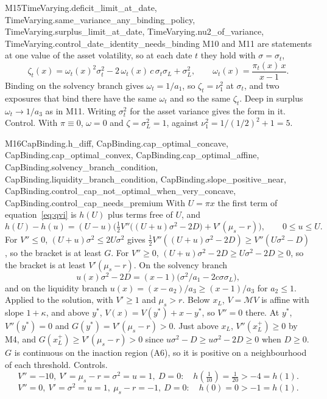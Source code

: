 \begin{mproof}{M15}{TimeVarying.deficit_limit_at_date, TimeVarying.same_variance_any_binding_policy, TimeVarying.surplus_limit_at_date, TimeVarying.nu2_of_variance, TimeVarying.control_date_identity_needs_binding}
M10 and M11 are statements at one value of the asset volatility, so at each date
$t$ they hold with $\sigma=\sigma_t$,
\[ \zeta_t(x)=\omega_t(x)^2\sigma_t^2-2\,\omega_t(x)\,c\,\sigma_t\sigma_L+\sigma_L^2,\qquad \omega_t(x)=\frac{\pi_t(x)\,x}{x-1} . \]
Binding on the solvency branch gives $\omega_t=1/a_1$, so $\zeta_t=\nu_1^2$ at
$\sigma_t$, and two exposures that bind there have the same $\omega_t$ and so the
same $\zeta_t$. Deep in surplus $\omega_t\to1/a_3$ as in M11. Writing $\sigma_t^2$
for the asset variance gives the form in it. Control. With $\pi\equiv0$,
$\omega=0$ and $\zeta=\sigma_L^2=1$, against $\nu_1^2=1/(1/2)^2+1=5$.
\end{mproof}

\begin{mproof}{M16}{CapBinding.h_diff, CapBinding.cap_optimal_concave, CapBinding.cap_optimal_convex, CapBinding.cap_optimal_affine, CapBinding.solvency_branch_condition, CapBinding.liquidity_branch_condition, CapBinding.slope_positive_near, CapBinding.control_cap_not_optimal_when_very_concave, CapBinding.control_cap_needs_premium}
With $U=\pi x$ the first term of equation~\eqref{eq:qvi} is $h(U)$ plus terms free of $U$, and
\[ h(U)-h(u)=(U-u)\Big(\tfrac12V''\big((U+u)\sigma^2-2D\big)+V'(\mu_s-r)\Big),\qquad 0\le u\le U . \]
For $V''\le0$, $(U+u)\sigma^2\le2U\sigma^2$ gives
$\tfrac12V''((U+u)\sigma^2-2D)\ge V''(U\sigma^2-D)$, so the bracket is at least $G$.
For $V''\ge0$, $(U+u)\sigma^2-2D\ge U\sigma^2-2D\ge0$, so the bracket is at least
$V'(\mu_s-r)$. On the solvency branch
\[ u(x)\sigma^2-2D=(x-1)\big(\sigma^2/a_1-2c\sigma\sigma_L\big), \]
and on the liquidity branch $u(x)=(x-a_2)/a_3\ge(x-1)/a_3$ for $a_2\le1$.
Applied to the solution, with $V'\ge1$ and $\mu_s>r$. Below $x_L$, $V=\mathcal MV$ is
affine with slope $1+\kappa$, and above $y^*$, $V(x)=V(y^*)+x-y^*$, so $V''=0$ there.
At $y^*$, $V''(y^*)=0$ and $G(y^*)=V'(\mu_s-r)>0$. Just above $x_L$, $V''(x_L^+)\ge0$
by M4, and $G(x_L^+)\ge V'(\mu_s-r)>0$ since $u\sigma^2-D\ge u\sigma^2-2D\ge0$ when
$D\ge0$. $G$ is continuous on the inaction region (A6), so it is positive on a
neighbourhood of each threshold. Controls.
\[ V''=-10,\ V'=\mu_s-r=\sigma^2=u=1,\ D=0:\quad h(\tfrac1{10})=\tfrac1{20}>-4=h(1). \]
\[ V''=0,\ V'=\sigma^2=u=1,\ \mu_s-r=-1,\ D=0:\quad h(0)=0>-1=h(1). \]
\end{mproof}

